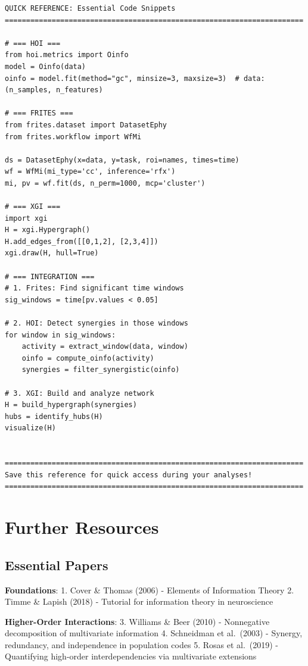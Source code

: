 \documentclass[
  11pt,
  letterpaper,
  oneside,
  openany]{book}
\begin{document}
\begin{verbatim}
QUICK REFERENCE: Essential Code Snippets
======================================================================

# === HOI ===
from hoi.metrics import Oinfo
model = Oinfo(data)
oinfo = model.fit(method="gc", minsize=3, maxsize=3)  # data: (n_samples, n_features)

# === FRITES ===
from frites.dataset import DatasetEphy
from frites.workflow import WfMi

ds = DatasetEphy(x=data, y=task, roi=names, times=time)
wf = WfMi(mi_type='cc', inference='rfx')
mi, pv = wf.fit(ds, n_perm=1000, mcp='cluster')

# === XGI ===
import xgi
H = xgi.Hypergraph()
H.add_edges_from([[0,1,2], [2,3,4]])
xgi.draw(H, hull=True)

# === INTEGRATION ===
# 1. Frites: Find significant time windows
sig_windows = time[pv.values < 0.05]

# 2. HOI: Detect synergies in those windows
for window in sig_windows:
    activity = extract_window(data, window)
    oinfo = compute_oinfo(activity)
    synergies = filter_synergistic(oinfo)

# 3. XGI: Build and analyze network
H = build_hypergraph(synergies)
hubs = identify_hubs(H)
visualize(H)


======================================================================
Save this reference for quick access during your analyses!
======================================================================
\end{verbatim}

\section{Further Resources}\label{further-resources-1}

\subsection{Essential Papers}\label{essential-papers-1}

\textbf{Foundations}: 1. Cover \& Thomas (2006) - Elements of
Information Theory 2. Timme \& Lapish (2018) - Tutorial for information
theory in neuroscience

\textbf{Higher-Order Interactions}: 3. Williams \& Beer (2010) -
Nonnegative decomposition of multivariate information 4. Schneidman et
al.~(2003) - Synergy, redundancy, and independence in population codes
5. Rosas et al.~(2019) - Quantifying high-order interdependencies via
multivariate extensions
\end{document}
